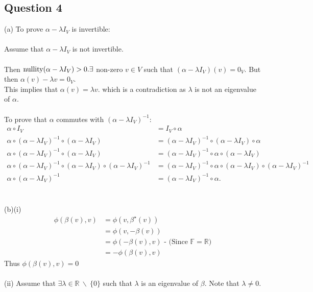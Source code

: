 \documentclass{article}
\begin{document}
\subsection*{Question 4}
(a) To prove $\alpha-\lambda I_V$ is invertible:\\\\ Assume that $\alpha - \lambda I_V$ is not invertible.\\\\Then $\text{nullity}(\alpha - \lambda I_V) > 0.\\ \exists$ non-zero $ v \in V$ such that $(\alpha - \lambda I_V)(v) = 0_V.$ But then $\alpha(v) - \lambda v = 0_V$. \\This implies that $\alpha(v) = \lambda v.$
which is a contradiction as $\lambda$ is not an eigenvalue of $\alpha.$
\\\\To prove that $\alpha$ commutes with $(\alpha - \lambda I_V)^{-1}:$\begin{align*}
\alpha\circ I_V &= I_V \circ \alpha
\\ \alpha\circ(\alpha -\lambda I_V)^{-1}\circ(\alpha -\lambda I_V) &= (\alpha -\lambda I_V)^{-1}\circ(\alpha -\lambda I_V)\circ\alpha
\\\alpha\circ(\alpha -\lambda I_V)^{-1}\circ(\alpha -\lambda I_V) &= (\alpha -\lambda I_V)^{-1}\circ\alpha\circ(\alpha -\lambda I_V)\\\alpha\circ(\alpha -\lambda I_V)^{-1}\circ(\alpha -\lambda I_V)\circ(\alpha-\lambda I_V)^{-1} &= (\alpha -\lambda I_V)^{-1}\circ\alpha\circ(\alpha -\lambda I_V)\circ(\alpha-\lambda I_V)^{-1}\\
\alpha\circ(\alpha -\lambda I_V)^{-1} &= (\alpha-\lambda I_V)^{-1}\circ\alpha.
\end{align*}\\\\
(b)(i)\begin{align*}
\phi(\beta(v),v) &= \phi(v,\beta^\star(v))\\
&= \phi(v,-\beta(v))\\
 &= \phi(-\beta(v),v) \text{ - (Since $\mathbb{F} = \mathbb{R}$)}\\
 &= -\phi(\beta(v),v)
\end{align*}
Thus $\phi(\beta(v),v) = 0$\\\\
(ii) Assume that $\exists \lambda \in \mathbb{R}\ \backslash\ \{0\}$ such that $\lambda$ is an eigenvalue of $\beta.$ Note that $\lambda \neq 0.$\\\\
\end{document}
